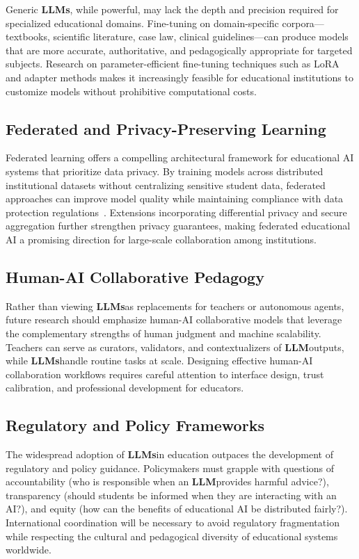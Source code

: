 \documentclass[preprint,12pt]{article}
\newcommand{\LLM}{\textbf{LLM}}
\newcommand{\LLMs}{\textbf{LLMs}}
\theoremstyle{mystyle}
\begin{document}
Generic \LLMs, while powerful, may lack the depth and precision required for specialized educational domains. Fine-tuning on domain-specific corpora---textbooks, scientific literature, case law, clinical guidelines---can produce models that are more accurate, authoritative, and pedagogically appropriate for targeted subjects. Research on parameter-efficient fine-tuning techniques such as LoRA~\citep{hu2022lora} and adapter methods makes it increasingly feasible for educational institutions to customize models without prohibitive computational costs.

\subsection{Federated and Privacy-Preserving Learning}
\label{sec:federated}

Federated learning offers a compelling architectural framework for educational AI systems that prioritize data privacy. By training models across distributed institutional datasets without centralizing sensitive student data, federated approaches can improve model quality while maintaining compliance with data protection regulations~\citep{yue2024privacy}. Extensions incorporating differential privacy and secure aggregation further strengthen privacy guarantees, making federated educational AI a promising direction for large-scale collaboration among institutions.

\subsection{Human-AI Collaborative Pedagogy}
\label{sec:collaborative}

Rather than viewing \LLMs as replacements for teachers or autonomous agents, future research should emphasize human-AI collaborative models that leverage the complementary strengths of human judgment and machine scalability. Teachers can serve as curators, validators, and contextualizers of \LLM outputs, while \LLMs handle routine tasks at scale. Designing effective human-AI collaboration workflows requires careful attention to interface design, trust calibration, and professional development for educators.

\subsection{Regulatory and Policy Frameworks}
\label{sec:regulatory}

The widespread adoption of \LLMs in education outpaces the development of regulatory and policy guidance. Policymakers must grapple with questions of accountability (who is responsible when an \LLM provides harmful advice?), transparency (should students be informed when they are interacting with an AI?), and equity (how can the benefits of educational AI be distributed fairly?). International coordination will be necessary to avoid regulatory fragmentation while respecting the cultural and pedagogical diversity of educational systems worldwide.
\end{document}
